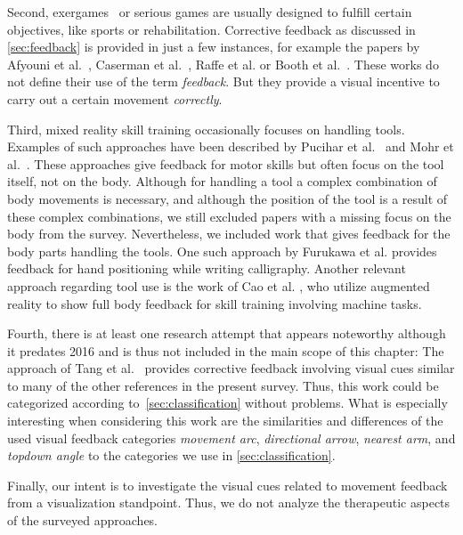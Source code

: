 Second, exergames~\cite{oh2010defining} or serious games are usually designed to fulfill certain objectives, like sports or rehabilitation. Corrective feedback as discussed in \autoref{sec:feedback} is provided in just a few instances, for example the papers by Afyouni et al.~\cite{afyouni2020arb}, Caserman et al.~\cite{caserman2021fbm}, Raffe et al. \cite{raffe2018cst} or Booth et al.~\cite{booth2019vue}. These works do not define their use of the term \emph{feedback}. But they provide a visual incentive to carry out a certain movement \emph{correctly}.

Third, mixed reality skill training occasionally focuses on handling tools. Examples of such approaches have been described by Pucihar et al.~\cite{pucihar2015dcm} and Mohr et al.~\cite{mohr2017rvt}. These approaches give feedback for motor skills but often focus on the tool itself, not on the body. Although for handling a tool a complex combination of body movements is necessary, and although the position of the tool is a result of these complex combinations, we still excluded papers with a missing focus on the body from the survey. Nevertheless, we included work that gives feedback for the body parts handling the tools. One such approach by Furukawa et al.\cite{furukawa2018dar} provides feedback for hand positioning while writing calligraphy. Another relevant approach regarding tool use is the work of Cao et al. \cite{cao2020esa}, who utilize augmented reality to show full body feedback for skill training involving machine tasks.

Fourth, there is at least one research attempt that appears noteworthy although it predates 2016 and is thus not included in the main scope of this chapter: The approach of Tang et al.~\cite{tang2015pah} provides corrective feedback involving visual cues similar to many of the other references in the present survey. Thus, this work could be categorized according to~\autoref{sec:classification} without problems. What is especially interesting when considering this work are the similarities and differences of the used visual feedback categories \emph{movement arc}, \emph{directional arrow}, \emph{nearest arm}, and \emph{topdown angle} to the categories we use in \autoref{sec:classification}.


Finally, our intent is to investigate the visual cues related to movement feedback from a visualization standpoint. Thus, we do not analyze the therapeutic aspects of the surveyed approaches.

